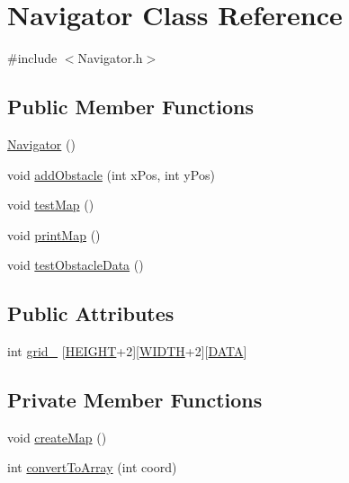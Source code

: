 \hypertarget{class_navigator}{}\section{Navigator Class Reference}
\label{class_navigator}


{\ttfamily \#include $<$Navigator.\+h$>$}

\subsection*{Public Member Functions}
\begin{DoxyCompactItemize}
\item 
\mbox{\hyperlink{class_navigator_a59230ab4698882f754d5ce275a1a4030}{Navigator}} ()
\item 
void \mbox{\hyperlink{class_navigator_af5a35f0ae71309c1b276257709b24390}{add\+Obstacle}} (int x\+Pos, int y\+Pos)
\item 
void \mbox{\hyperlink{class_navigator_afe98283ec2d1bf0125c63eb077cc1d61}{test\+Map}} ()
\item 
void \mbox{\hyperlink{class_navigator_a2565ae0fea67cfec45a553ef0d7e06a4}{print\+Map}} ()
\item 
void \mbox{\hyperlink{class_navigator_ae31be1ae0d17e7fc78aa7c6a4553fca2}{test\+Obstacle\+Data}} ()
\end{DoxyCompactItemize}
\subsection*{Public Attributes}
\begin{DoxyCompactItemize}
\item 
int \mbox{\hyperlink{class_navigator_ad295138915accad1b15031a977f59b3e}{grid\+\_\+}} \mbox{[}\mbox{\hyperlink{_navigator_8h_af728b7647e0b8c49832983a31f9a2e9b}{H\+E\+I\+G\+HT}}+2\mbox{]}\mbox{[}\mbox{\hyperlink{_navigator_8h_a9649ab8139c4c2ea5c93625b30d92a05}{W\+I\+D\+TH}}+2\mbox{]}\mbox{[}\mbox{\hyperlink{_navigator_8h_ace45c8c944a852d4990f5f8f87b2335e}{D\+A\+TA}}\mbox{]}
\end{DoxyCompactItemize}
\subsection*{Private Member Functions}
\begin{DoxyCompactItemize}
\item 
void \mbox{\hyperlink{class_navigator_a8b0cb171e3e3b16b206278fb23f624bc}{create\+Map}} ()
\item 
int \mbox{\hyperlink{class_navigator_a7a745d33cfa5cdfc551c87f3f23dc28e}{convert\+To\+Array}} (int coord)
\end{DoxyCompactItemize}


